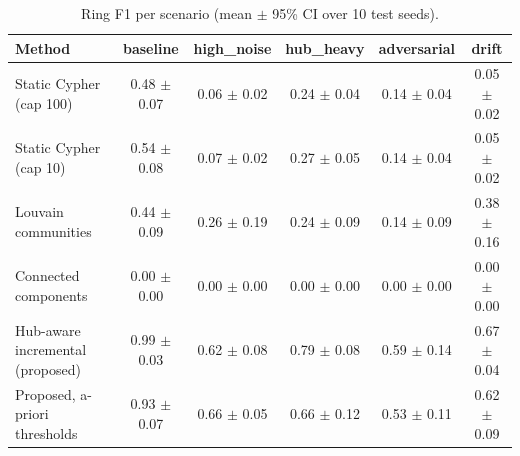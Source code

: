 \begin{table}[t]
\centering
\caption{Ring F1 per scenario (mean $\pm$ 95\% CI over 10 test seeds).}
\label{tab:scenarios}
\begin{tabular}{lccccc}
\toprule
Method & baseline & high\_noise & hub\_heavy & adversarial & drift \\
\midrule
Static Cypher (cap 100) & 0.48 $\pm$ 0.07 & 0.06 $\pm$ 0.02 & 0.24 $\pm$ 0.04 & 0.14 $\pm$ 0.04 & 0.05 $\pm$ 0.02 \\
Static Cypher (cap 10) & 0.54 $\pm$ 0.08 & 0.07 $\pm$ 0.02 & 0.27 $\pm$ 0.05 & 0.14 $\pm$ 0.04 & 0.05 $\pm$ 0.02 \\
Louvain communities & 0.44 $\pm$ 0.09 & 0.26 $\pm$ 0.19 & 0.24 $\pm$ 0.09 & 0.14 $\pm$ 0.09 & 0.38 $\pm$ 0.16 \\
Connected components & 0.00 $\pm$ 0.00 & 0.00 $\pm$ 0.00 & 0.00 $\pm$ 0.00 & 0.00 $\pm$ 0.00 & 0.00 $\pm$ 0.00 \\
Hub-aware incremental (proposed) & 0.99 $\pm$ 0.03 & 0.62 $\pm$ 0.08 & 0.79 $\pm$ 0.08 & 0.59 $\pm$ 0.14 & 0.67 $\pm$ 0.04 \\
Proposed, a-priori thresholds & 0.93 $\pm$ 0.07 & 0.66 $\pm$ 0.05 & 0.66 $\pm$ 0.12 & 0.53 $\pm$ 0.11 & 0.62 $\pm$ 0.09 \\
\bottomrule
\end{tabular}
\end{table}
